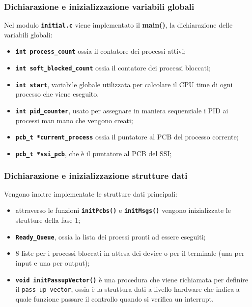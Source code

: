 \documentclass{article}
\begin{document}
	\subsubsection{Dichiarazione e inizializzazione variabili globali}
	Nel modulo \texttt{\textbf{initial.c}} viene implementato il \textbf{main()},
	la dichiarazione delle variabili globali:
	\begin{itemize}
		\item \texttt{\textbf{int process\_count}} ossia il contatore dei processi
			attivi;

		\item \texttt{\textbf{int soft\_blocked\_count}} ossia il contatore dei
			processi bloccati;

		\item \texttt{\textbf{int start}}, variabile globale utilizzata per calcolare
			il CPU time di ogni processo che viene eseguito.

		\item \texttt{\textbf{int pid\_counter}}, usato per assegnare in maniera sequenziale
			i PID ai processi man mano che vengono creati;

		\item \texttt{\textbf{pcb\_t *current\_process}} ossia il puntatore al PCB
			del processo corrente;

		\item \texttt{\textbf{pcb\_t *ssi\_pcb}}, che è il puntatore al PCB del SSI;
	\end{itemize}

	\subsubsection{Dichiarazione e inizializzazione strutture dati}
	Vengono inoltre implementate le strutture dati principali:
	\begin{itemize}
		\item attraverso le funzioni \texttt{\textbf{initPcbs()}} e \texttt{\textbf{initMsgs()}}
			vengono inizializzate le strutture della fase 1;

		\item \texttt{\textbf{Ready\_Queue}}, ossia la lista dei proessi pronti ad essere
			eseguiti;

		\item 8 liste per i processi bloccati in attesa dei device o per il terminale
			(una per input e una per output);

		\item \texttt{\textbf{void initPassupVector()}} è una procedura che viene
			richiamata per definire il \texttt{pass up vector}, ossia è la struttura
			dati a livello hardware che indica a quale funzione passare il controllo
			quando si verifica un interrupt.
	\end{itemize}
\end{document}
